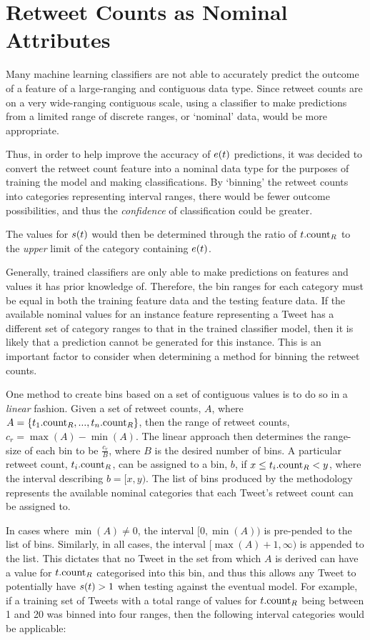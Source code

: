 \section{Retweet Counts as Nominal Attributes}
Many machine learning classifiers are not able to accurately predict the outcome of a feature of a large-ranging and contiguous data type. Since retweet counts are on a very wide-ranging contiguous scale, using a classifier to make predictions from a limited range of discrete ranges, or `nominal' data, would be more appropriate.

Thus, in order to help improve the accuracy of $e(t)$ predictions, it was decided to convert the retweet count feature into a nominal data type for the purposes of training the model and making classifications. By `binning' the retweet counts into categories representing interval ranges, there would be fewer outcome possibilities, and thus the \textit{confidence} of classification could be greater.

The values for $s(t)$ would then be determined through the ratio of $t.\textrm{count}_R$ to the \textit{upper} limit of the category containing $e(t)$.

Generally, trained classifiers are only able to make predictions on features and values it has prior knowledge of. Therefore, the bin ranges for each category must be equal in both the training feature data and the testing feature data. If the available nominal values for an instance feature representing a Tweet has a different set of category ranges to that in the trained classifier model, then it is likely that a prediction cannot be generated for this instance. This is an important factor to consider when determining a method for binning the retweet counts.

One method to create bins based on a set of contiguous values is to do so in a \textit{linear} fashion. Given a set of retweet counts, $A$, where $A = \left\{t_1.\textrm{count}_R, ..., t_n.\textrm{count}_R\right\}$, then the range of retweet counts, $c_r = \max({A}) - \min({A})$. The linear approach then determines the range-size of each bin to be $\frac{c_r}{B}$, where $B$ is the desired number of bins. A particular retweet count, $t_i.\textrm{count}_R$, can be assigned to a bin, $b$, if $x \leq t_i.\textrm{count}_R < y$, where the interval describing $b = [x,y)$. The list of bins produced by the methodology represents the available nominal categories that each Tweet's retweet count can be assigned to.

In cases where $\min({A}) \neq 0$, the interval $[0,\min({A}))$ is pre-pended to the list of bins. Similarly, in all cases, the interval $[\max({A})+1,\infty)$ is appended to the list. This dictates that no Tweet in the set from which $A$ is derived can have a value for $t.\textrm{count}_R$ categorised into this bin, and thus this allows any Tweet to potentially have $s(t) > 1$ when testing against the eventual model. For example, if a training set of Tweets with a total range of values for $t.\textrm{count}_R$ being between 1 and 20 was binned into four ranges, then the following interval categories would be applicable:

